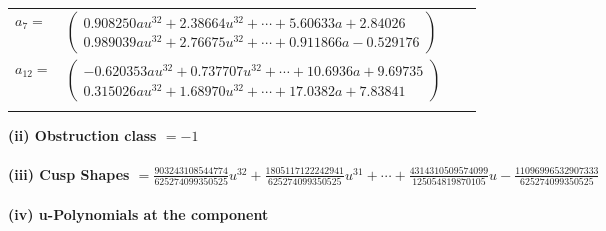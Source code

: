 \documentclass[1p]{elsarticle_modified}
\theoremstyle{definition}
\begin{document}
\begin{tabular}{m{7pt} m{180pt} m{7pt} m{180pt} }
\flushright $a_{7}=$&$\begin{pmatrix}0.908250 a u^{32}+2.38664 u^{32}+\cdots+5.60633 a+2.84026\\0.989039 a u^{32}+2.76675 u^{32}+\cdots+0.911866 a-0.529176\end{pmatrix}$ \\
\flushright $a_{12}=$&$\begin{pmatrix}-0.620353 a u^{32}+0.737707 u^{32}+\cdots+10.6936 a+9.69735\\0.315026 a u^{32}+1.68970 u^{32}+\cdots+17.0382 a+7.83841\end{pmatrix}$\\&\end{tabular}
\flushleft \textbf{(ii) Obstruction class $= -1$}\\~\\
\flushleft \textbf{(iii) Cusp Shapes $= \frac{903243108544774}{625274099350525} u^{32}+\frac{1805117122242941}{625274099350525} u^{31}+\cdots+\frac{4314310509574099}{125054819870105} u-\frac{11096996532907333}{625274099350525}$}\\~\\
\newpage\renewcommand{\arraystretch}{1}
\flushleft \textbf{(iv) u-Polynomials at the component}\newline \\
\end{document}
